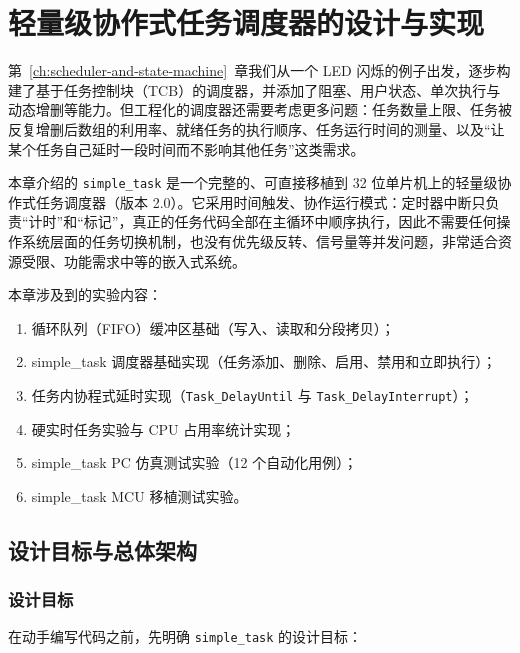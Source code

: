 \chapter{轻量级协作式任务调度器的设计与实现} \label{ch:simple-task}

第~\ref{ch:scheduler-and-state-machine}~章我们从一个 LED 闪烁的例子出发，逐步构建了基于任务控制块（TCB）的调度器，并添加了阻塞、用户状态、单次执行与动态增删等能力。但工程化的调度器还需要考虑更多问题：任务数量上限、任务被反复增删后数组的利用率、就绪任务的执行顺序、任务运行时间的测量、以及“让某个任务自己延时一段时间而不影响其他任务”这类需求。

本章介绍的 \texttt{simple\_task} 是一个完整的、可直接移植到 32 位单片机上的轻量级协作式任务调度器（版本 2.0）。它采用时间触发、协作运行模式：定时器中断只负责“计时”和“标记”，真正的任务代码全部在主循环中顺序执行，因此不需要任何操作系统层面的任务切换机制，也没有优先级反转、信号量等并发问题，非常适合资源受限、功能需求中等的嵌入式系统。

\medskip 本章涉及到的实验内容：
\begin{enumerate}
\item 循环队列（FIFO）缓冲区基础（写入、读取和分段拷贝）；
\item simple\_task 调度器基础实现（任务添加、删除、启用、禁用和立即执行）；
\item 任务内协程式延时实现（\texttt{Task\_DelayUntil} 与 \texttt{Task\_DelayInterrupt}）；
\item 硬实时任务实验与 CPU 占用率统计实现；
\item simple\_task PC 仿真测试实验（12 个自动化用例）；
\item simple\_task MCU 移植测试实验。
\end{enumerate}

\section{设计目标与总体架构}

\subsection{设计目标}

在动手编写代码之前，先明确 \texttt{simple\_task} 的设计目标：


